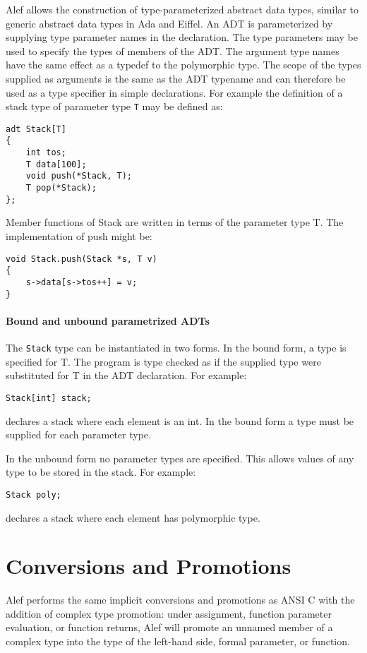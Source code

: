 Alef allows the construction of type-parameterized abstract data types,
similar to generic abstract data types in Ada and Eiffel. An ADT is
parameterized by supplying type parameter names in the declaration. The
type parameters may be used to specify the types of members of the ADT.
The argument type names have the same effect as a typedef to the
polymorphic type. The scope of the types supplied as arguments is the
same as the ADT typename and can therefore be used as a type specifier
in simple declarations. For example the definition of a stack type of
parameter type \passthrough{\lstinline!T!} may be defined as:

\begin{lstlisting}
adt Stack[T]
{
    int tos;
    T data[100];
    void push(*Stack, T);
    T pop(*Stack);
};
\end{lstlisting}

Member functions of Stack are written in terms of the parameter type T.
The implementation of push might be:

\begin{lstlisting}
void Stack.push(Stack *s, T v)
{
    s->data[s->tos++] = v;
}
\end{lstlisting}

\hypertarget{bound-and-unbound-parametrized-adts}{%
\paragraph{Bound and unbound parametrized
ADTs}\label{bound-and-unbound-parametrized-adts}}

The \passthrough{\lstinline!Stack!} type can be instantiated in two
forms. In the bound form, a type is specified for T. The program is type
checked as if the supplied type were substituted for T in the ADT
declaration. For example:

\begin{lstlisting}
Stack[int] stack;
\end{lstlisting}

declares a stack where each element is an int. In the bound form a type
must be supplied for each parameter type.

In the unbound form no parameter types are specified. This allows values
of any type to be stored in the stack. For example:

\begin{lstlisting}
Stack poly;
\end{lstlisting}

declares a stack where each element has polymorphic type.

\hypertarget{conversions-and-promotions}{%
\section{Conversions and Promotions}\label{conversions-and-promotions}}

Alef performs the same implicit conversions and promotions as ANSI C
with the addition of complex type promotion: under assignment, function
parameter evaluation, or function returns, Alef will promote an unnamed
member of a complex type into the type of the left-hand side, formal
parameter, or function.

